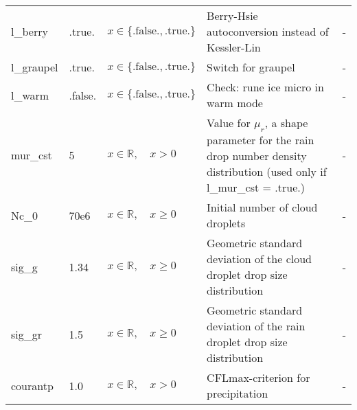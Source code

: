 \documentclass[twoside,11pt,fleqn,a4paper,english,openright]{report}
\begin{document}
\begin{center}
\begin{supertabular}{|l|p{1.6cm}|p{4cm}|p{6cm}|l|}
    l\_berry	& .true.		& $x\in\{\text{.false.},\text{.true.}\}$	& Berry-Hsie autoconversion instead of Kessler-Lin	& -\\
  l\_graupel	& .true.		& $x\in\{\text{.false.},\text{.true.}\}$	& Switch for graupel	& -\\
  l\_warm	& .false.		& $x\in\{\text{.false.},\text{.true.}\}$	& Check: rune ice micro in warm mode	& -\\
  mur\_cst	& 5			& $x \in \mathbb{R}, \quad x>0$	& Value for $\mu_r$, a shape parameter for the rain drop number density distribution (used only if l\_mur\_cst = .true.)	& -\\
  Nc\_0		& 70e6			& $x \in \mathbb{R}, \quad x \ge 0$	& Initial number of cloud droplets			& -\\
  sig\_g	& 1.34			& $x \in \mathbb{R}, \quad x \ge 0$	& Geometric standard deviation of the cloud droplet drop size distribution			& -\\
  sig\_gr	& 1.5		& $x \in \mathbb{R}, \quad x \ge 0$	& Geometric standard deviation of the rain droplet drop size distribution			& -\\
  courantp	& 1.0		& $x \in \mathbb{R}, \quad x>0$		& CFLmax-criterion for precipitation & -\\
\end{supertabular}
\end{center}

\newpage
\end{document}
